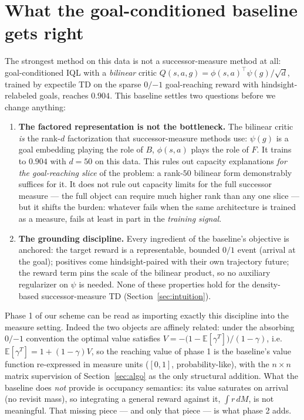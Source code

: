 \documentclass[10pt]{article}
\newcommand{\E}{\mathbb{E}}
\begin{document}
\section{What the goal-conditioned baseline gets right}
\label{sec:baseline}

The strongest method on this data is not a successor-measure method at all: goal-conditioned
IQL with a \emph{bilinear} critic $Q(s,a,g)=\phi(s,a)^{\top}\psi(g)/\sqrt{d}$, trained by
expectile TD on the sparse $0/{-1}$ goal-reaching reward with hindsight-relabeled goals,
reaches $0.904$.
This baseline settles two questions before we change anything:

\begin{enumerate}
  \item \textbf{The factored representation is not the bottleneck.}
  The bilinear critic \emph{is} the rank-$d$ factorization that successor-measure methods
  use: $\psi(g)$ is a goal embedding playing the role of $B$, $\phi(s,a)$ plays the role of
  $F$.
  It trains to $0.904$ with $d=50$ on this data.
  This rules out capacity explanations \emph{for the goal-reaching slice} of the problem:
  a rank-$50$ bilinear form demonstrably suffices for it.
  It does not rule out capacity limits for the full successor measure --- the full object
  can require much higher rank than any one slice --- but it shifts the burden: whatever
  fails when the same architecture is trained as a measure, fails at least in part in the
  \emph{training signal}.

  \item \textbf{The grounding discipline.}
  Every ingredient of the baseline's objective is anchored: the target reward is a
  representable, bounded $0/1$ event (arrival at the goal); positives come hindsight-paired
  with their own trajectory future; the reward term pins the scale of the bilinear product,
  so no auxiliary regularizer on $\psi$ is needed.
  None of these properties hold for the density-based successor-measure TD
  (Section~\ref{sec:intuition}).
\end{enumerate}

Phase 1 of our scheme can be read as importing exactly this discipline into the measure
setting.
Indeed the two objects are affinely related: under the absorbing $0/{-1}$ convention the
optimal value satisfies $V = -\big(1-\E[\gamma^{T}]\big)/(1-\gamma)$, i.e.\
$\E[\gamma^{T}] = 1+(1-\gamma)V$, so the reaching value of phase 1 is the baseline's value
function re-expressed in measure units ($[0,1]$, probability-like), with the $n\times n$
matrix supervision of Section~\ref{sec:algo} as the only structural addition.
What the baseline does \emph{not} provide is occupancy semantics: its value saturates on
arrival (no revisit mass), so integrating a general reward against it,
$\int r\,dM$, is not meaningful.
That missing piece --- and only that piece --- is what phase 2 adds.
\end{document}
